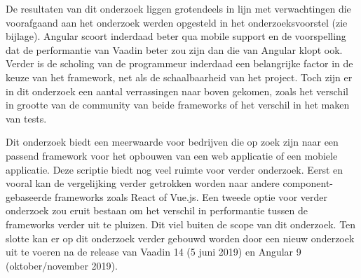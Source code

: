 De resultaten van dit onderzoek liggen grotendeels in lijn met verwachtingen die voorafgaand aan het onderzoek werden opgesteld in het onderzoeksvoorstel (zie bijlage). Angular scoort inderdaad beter qua mobile support en de voorspelling dat de performantie van Vaadin beter zou zijn dan die van Angular klopt ook. Verder is de scholing van de programmeur inderdaad een belangrijke factor in de keuze van het framework, net als de schaalbaarheid van het project. Toch zijn er in dit onderzoek een aantal verrassingen naar boven gekomen, zoals het verschil in grootte van de community van beide frameworks of het verschil in het maken van tests.

Dit onderzoek biedt een meerwaarde voor bedrijven die op zoek zijn naar een passend framework voor het opbouwen van een web applicatie of een mobiele applicatie. Deze scriptie biedt nog veel ruimte voor verder onderzoek. Eerst en vooral kan de vergelijking verder getrokken worden naar andere component-gebaseerde frameworks zoals React of Vue.js.   
Een tweede optie voor verder onderzoek zou eruit bestaan om het verschil in performantie tussen de frameworks verder uit te pluizen. Dit viel buiten de scope van dit onderzoek. 
Ten slotte kan er op dit onderzoek verder gebouwd worden door een nieuw onderzoek uit te voeren na de release van Vaadin 14 (5 juni 2019) en Angular 9 (oktober/november 2019).
